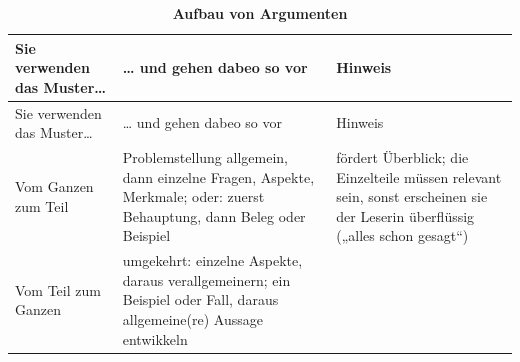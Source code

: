 \documentclass[]{book}
\theoremstyle{definition}
\theoremstyle{definition}
\theoremstyle{definition}
\theoremstyle{remark}
\begin{document}
\begin{longtable}[]{@{}lll@{}}
\caption{\textbf{\label{tab:argumente} Aufbau von
Argumenten}}\tabularnewline
\toprule
\begin{minipage}[b]{0.19\columnwidth}\raggedright\strut
Sie verwenden das Muster\ldots{}\strut
\end{minipage} & \begin{minipage}[b]{0.39\columnwidth}\raggedright\strut
\ldots{} und gehen dabeo so vor\strut
\end{minipage} & \begin{minipage}[b]{0.33\columnwidth}\raggedright\strut
Hinweis\strut
\end{minipage}\tabularnewline
\midrule
\endfirsthead
\toprule
\begin{minipage}[b]{0.19\columnwidth}\raggedright\strut
Sie verwenden das Muster\ldots{}\strut
\end{minipage} & \begin{minipage}[b]{0.39\columnwidth}\raggedright\strut
\ldots{} und gehen dabeo so vor\strut
\end{minipage} & \begin{minipage}[b]{0.33\columnwidth}\raggedright\strut
Hinweis\strut
\end{minipage}\tabularnewline
\midrule
\endhead
\begin{minipage}[t]{0.19\columnwidth}\raggedright\strut
Vom Ganzen zum Teil\strut
\end{minipage} & \begin{minipage}[t]{0.39\columnwidth}\raggedright\strut
Problemstellung allgemein, dann einzelne Fragen, Aspekte, Merkmale;
oder: zuerst Behauptung, dann Beleg oder Beispiel\strut
\end{minipage} & \begin{minipage}[t]{0.33\columnwidth}\raggedright\strut
fördert Überblick; die Einzelteile müssen relevant sein, sonst
erscheinen sie der Leserin überflüssig („alles schon gesagt``)
\vspace{-6mm}\strut
\end{minipage}\tabularnewline
\begin{minipage}[t]{0.19\columnwidth}\raggedright\strut
Vom Teil zum Ganzen\strut
\end{minipage} & \begin{minipage}[t]{0.39\columnwidth}\raggedright\strut
umgekehrt: einzelne Aspekte, daraus verallgemeinern; ein Beispiel oder
Fall, daraus allgemeine(re) Aussage entwikkeln\strut
\end{minipage} & \begin{minipage}[t]{0.33\columnwidth}\raggedright\strut

\end{minipage}
\end{longtable}
\end{document}
